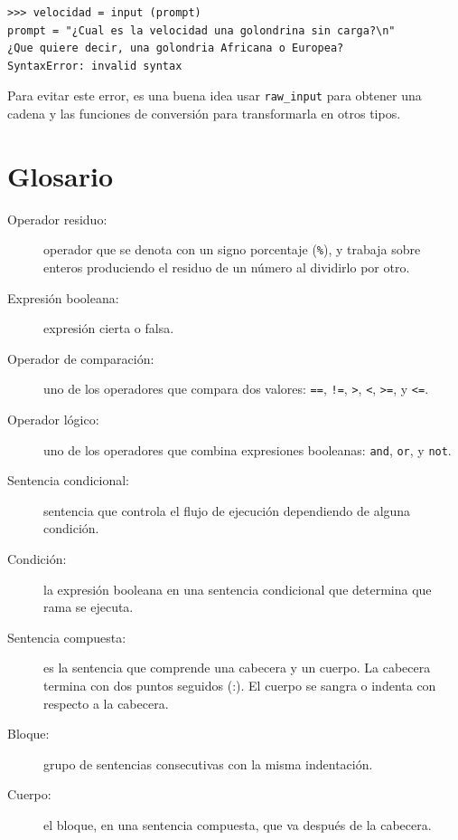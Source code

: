 \beforeverb
\begin{verbatim}
>>> velocidad = input (prompt)
prompt = "¿Cual es la velocidad una golondrina sin carga?\n"
¿Que quiere decir, una golondria Africana o Europea?
SyntaxError: invalid syntax
\end{verbatim}
\afterverb
%
Para evitar este error, es una buena idea usar \texttt{raw\_input} para obtener
una cadena y las funciones de  conversión para transformarla en otros tipos.


\section{Glosario}

\begin{description}

\item[Operador residuo:]  operador que se denota con un  signo porcentaje
(\texttt{\%}), y trabaja sobre enteros produciendo el residuo de un número al 
dividirlo por otro.

\item[Expresión booleana:]  expresión cierta o falsa.

\item[Operador de comparación:] uno de los operadores que compara dos 
valores: 
\texttt{==}, \texttt{!=}, \texttt{>}, \texttt{<}, \texttt{>=}, y \texttt{<=}.

\item[Operador lógico:] uno de los operadores que combina
expresiones booleanas: \texttt{and}, \texttt{or}, y \texttt{not}.

\item[Sentencia condicional:]  sentencia que controla el flujo
de ejecución dependiendo de alguna  condición.

\item[Condición:] la expresión booleana en una sentencia condicional 
que determina que rama se ejecuta.

\item[Sentencia compuesta:]  es la sentencia que comprende una
cabecera y un cuerpo. La cabecera termina con dos puntos seguidos (:). 
El cuerpo se sangra o indenta con respecto a la cabecera.

\item[Bloque:] grupo de sentencias consecutivas con la misma
indentación.

\item[Cuerpo:] el bloque, en una sentencia compuesta, que va 
después de la cabecera.


\end{description}

